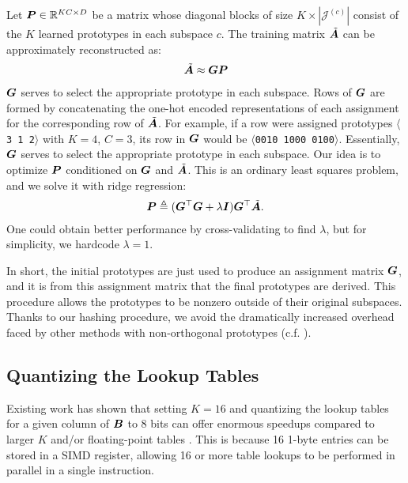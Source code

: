 Let $\bm{P} \in \mathbb{R}^{KC \times D}$ be a matrix whose diagonal blocks of size $K \times |\mathcal{J}^{(c)}|$ consist of the $K$ learned prototypes in each subspace $c$. The training matrix $\tilde{\bm{A}}$ can be approximately reconstructed as:
\begin{align}
    \tilde{\bm{A}} \approx \bm{G}\bm{P}
\end{align}
$\bm{G}$ serves to select the appropriate prototype in each subspace. Rows of $\bm{G}$ are formed by concatenating the one-hot encoded representations of each assignment for the corresponding row of $\tilde{\bm{A}}$. For example, if a row were assigned prototypes $\langle$\texttt{3 1 2}$\rangle$ with $K = 4$, $C = 3$, its row in $\bm{G}$ would be $\langle$\texttt{0010 1000 0100}$\rangle$. Essentially, $\bm{G}$ serves to select the appropriate prototype in each subspace. Our idea is to optimize $\bm{P}$ conditioned on $\bm{G}$ and $\tilde{\bm{A}}$. This is an ordinary least squares problem, and we solve it with ridge regression:
\begin{align}
    \bm{P} \triangleq (\bm{G}^\top \bm{G} + \lambda \bm{I}) \bm{G}^\top \tilde{\bm{A}}.
\end{align}
One could obtain better performance by cross-validating to find $\lambda$, but for simplicity, we hardcode $\lambda = 1$. %

In short, the initial prototypes are just used to produce an assignment matrix $\bm{G}$, and it is from this assignment matrix that the final prototypes are derived. This procedure allows the prototypes to be nonzero outside of their original subspaces. Thanks to our hashing procedure, we avoid the dramatically increased overhead faced by other methods with non-orthogonal prototypes (c.f. \cite{otq,aq,cq,grvq,lsq,stackedQuantizers}).

\subsection{Quantizing the Lookup Tables}

Existing work has shown that setting $K = 16$ and quantizing the lookup tables for a given column of $\bm{B}$ to 8 bits can offer enormous speedups compared to larger $K$ and/or floating-point tables \cite{bolt, quickAdc, quickerAdc}. This is because 16 1-byte entries can be stored in a SIMD register, allowing 16 or more table lookups to be performed in parallel in a single instruction.

